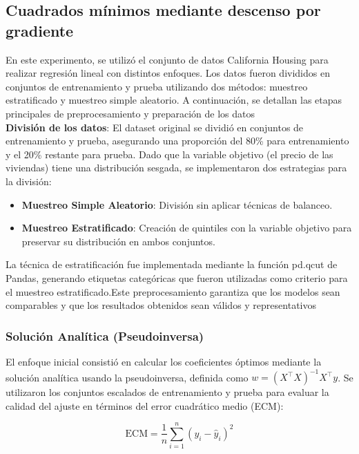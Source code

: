 \documentclass{tp02}
\begin{document}
\subsection{Cuadrados mínimos mediante descenso por gradiente}

En este experimento, se utilizó el conjunto de datos California
Housing para realizar regresión lineal con distintos enfoques.
Los datos fueron divididos en conjuntos de entrenamiento y
prueba utilizando dos métodos: muestreo estratificado y muestreo
simple aleatorio. A continuación, se detallan las etapas 
principales de preprocesamiento y preparación de los datos\\

\textbf{División de los datos}:
El dataset original se dividió en conjuntos de entrenamiento y prueba,
asegurando una proporción del 80\% para entrenamiento y el 20\% 
restante para prueba. Dado que la variable objetivo
(el precio de las viviendas) tiene una distribución sesgada,
se implementaron dos estrategias para la división:

\begin{itemize}
    \item \textbf{Muestreo Simple Aleatorio}: División sin aplicar técnicas de balanceo.
    \item \textbf{Muestreo Estratificado}: Creación de quintiles con la variable objetivo para preservar su distribución en ambos conjuntos.
\end{itemize}

La técnica de estratificación fue implementada mediante 
la función pd.qcut de Pandas, generando etiquetas
categóricas que fueron utilizadas como criterio para el 
muestreo estratificado.Este preprocesamiento garantiza 
que los modelos sean comparables y que los resultados obtenidos sean
válidos y representativos

\subsubsection{Solución Analítica (Pseudoinversa)}
El enfoque inicial consistió en calcular los coeficientes óptimos 
mediante la solución analítica usando la pseudoinversa, definida como 
$w = (X^\top X)^{-1} X^\top y$. Se utilizaron los conjuntos escalados 
de entrenamiento y prueba para evaluar la calidad del ajuste en 
términos del error cuadrático medio (ECM):

\begin{equation}
\text{ECM} = \frac{1}{n} \sum_{i=1}^n (y_i - \hat{y}_i)^2
\end{equation}
\end{document}
